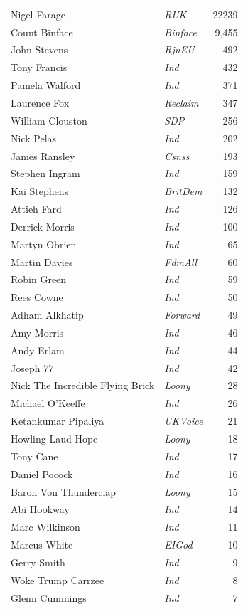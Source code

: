 \documentclass[a4paper,openany]{book}
\begin{document}
\noindent
\begin{tabular*}{\columnwidth}{@{\extracolsep{\fill}} p{} >{\itshape}l r @{\extracolsep{\fill}}}
	Nigel Farage & RUK & 22239\\
	Count Binface & Binface & 9,455\\
	John Stevens & RjnEU & 492\\
	Tony Francis & Ind & 432\\
	Pamela Walford & Ind & 371\\
	Laurence Fox & Reclaim & 347\\
	William Clouston & SDP & 256\\
	Nick Pelas & Ind & 202\\
	James Ransley & Csnss & 193\\
	Stephen Ingram & Ind & 159\\
	Kai Stephens & BritDem & 132\\
	Attieh Fard & Ind & 126\\
	Derrick Morris & Ind & 100\\
	Martyn Obrien & Ind & 65\\
	Martin Davies & FdmAll & 60\\
	Robin Green & Ind & 59\\
	Rees Cowne & Ind & 50\\
	Adham Alkhatip & Forward & 49\\
	Amy Morris & Ind & 46\\
	Andy Erlam & Ind & 44\\
	Joseph 77 & Ind & 42\\
	Nick The Incredible Flying Brick & Loony & 28\\
	Michael O'Keeffe & Ind & 26\\
	Ketankumar Pipaliya & UKVoice & 21\\
	Howling Laud Hope & Loony & 18\\
	Tony Cane & Ind & 17\\
	Daniel Pocock & Ind & 16\\
	Baron Von Thunderclap & Loony & 15\\
	Abi Hookway & Ind & 14\\
	Marc Wilkinson & Ind & 11\\
	Marcus White & EIGod & 10\\
	Gerry Smith & Ind & 9\\
	Woke Trump Carrzee & Ind & 8\\
	Glenn Cummings & Ind & 7\\
\end{tabular*}
\end{document}
